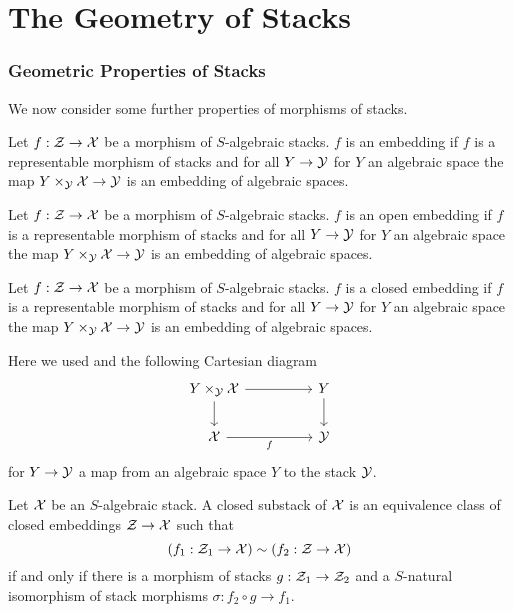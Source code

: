 \part*{The Geometry of Stacks}\label{part: geometry of stacks}
\section{Geometric Properties of Stacks}\label{sec: geometry of stacks}
We now consider some further properties of morphisms of stacks. 
\begin{definition}[Embedding]\label{def: embedding of stacks}
    Let $f:\mathcal{Z}\to\mathcal{X}$ be a morphism of $S$-algebraic stacks. $f$ is an embedding if $f$ is a representable morphism of stacks and for all $Y\to\mathcal{Y}$ for $Y$ an algebraic space the map $Y\times_{\mathcal{Y}}\mathcal{X}\to\mathcal{Y}$ is an embedding of algebraic spaces. 
\end{definition}
\begin{definition}\label{def: open embedding of stacks}
    Let $f:\mathcal{Z}\to\mathcal{X}$ be a morphism of $S$-algebraic stacks. $f$ is an open embedding if $f$ is a representable morphism of stacks and for all $Y\to\mathcal{Y}$ for $Y$ an algebraic space the map $Y\times_{\mathcal{Y}}\mathcal{X}\to\mathcal{Y}$ is an embedding of algebraic spaces. 
\end{definition}
\begin{definition}\label{def: closed embedding of stacks}
    Let $f:\mathcal{Z}\to\mathcal{X}$ be a morphism of $S$-algebraic stacks. $f$ is a closed embedding if $f$ is a representable morphism of stacks and for all $Y\to\mathcal{Y}$ for $Y$ an algebraic space the map $Y\times_{\mathcal{Y}}\mathcal{X}\to\mathcal{Y}$ is an embedding of algebraic spaces. 
\end{definition}
Here we used  and the following Cartesian diagram
$$%
    \begin{tikzcd}
        {Y\times_{\Ycal}\Xcal} && Y \\
        \Xcal && \Ycal
        \arrow["f"', from=2-1, to=2-3]
        \arrow[from=1-3, to=2-3]
        \arrow[from=1-1, to=2-1]
        \arrow[from=1-1, to=1-3]
    \end{tikzcd}$$
for $Y\to\mathcal{Y}$ a map from an algebraic space $Y$ to the stack $\mathcal{Y}$. 
\begin{definition}\label{def: closed substack}
    Let $\mathcal{X}$ be an $S$-algebraic stack. A closed substack of $\mathcal{X}$ is an equivalence class of closed embeddings $\mathcal{Z}\to\mathcal{X}$ such that 
    $$\left(f_{1}:\mathcal{Z}_{1}\to\mathcal{X}\right)\sim\left(f_{2}:\mathcal{Z}\to\mathcal{X}\right)$$
    if and only if there is a morphism of stacks $g:\mathcal{Z}_{1}\to\mathcal{Z}_{2}$ and a $S$-natural isomorphism of stack morphisms $\sigma:f_{2}\circ g\to f_{1}$. 
\end{definition}
